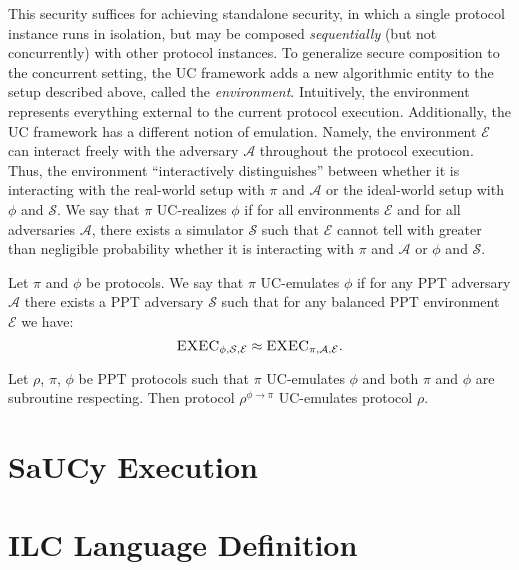 \documentclass{llncs}
\newcommand{\mc}[1]{\mathcal{{#1}}}
\begin{document}
This security suffices for achieving standalone security, in
which a single protocol instance runs in isolation, but may be
composed \emph{sequentially} (but not concurrently) with other protocol
instances. To generalize secure composition to the concurrent setting, the UC
framework adds a new algorithmic entity to the setup described above, called
the \emph{environment}. Intuitively, the environment represents everything
external to the current protocol execution. Additionally, the UC framework has a
different notion of emulation. Namely, the environment $\mc{E}$ can interact
freely with the adversary $\mc{A}$ throughout the protocol execution. Thus, the
environment ``interactively distinguishes'' between whether it is interacting
with the real-world setup with $\pi$ and $\mc{A}$ or the ideal-world setup with
$\phi$ and $\mc{S}$. We say that $\pi$ UC-realizes $\phi$ if for all
environments $\mc{E}$ and for all adversaries $\mc{A}$, there exists a simulator
$\mc{S}$ such that $\mc{E}$ cannot tell with greater than negligible probability
whether it is interacting with $\pi$ and $\mc{A}$ or $\phi$ and $\mc{S}$.

\begin{definition}
Let $\pi$ and $\phi$ be protocols. We say that $\pi$ UC-emulates $\phi$ if for
any PPT adversary $\mc{A}$ there exists a PPT adversary $\mc{S}$ such that for
any balanced PPT environment $\mc{E}$ we have:
\begin{equation*}
\textsc{EXEC}_{\phi, \mc{S}, \mc{E}} \approx \textsc{EXEC}_{\pi, \mc{A}, \mc{E}}.
\end{equation*}
\end{definition}

\begin{theorem}
Let $\rho$, $\pi$, $\phi$ be PPT protocols such that $\pi$ UC-emulates $\phi$
and both $\pi$ and $\phi$ are subroutine respecting. Then protocol
$\rho^{\phi \rightarrow \pi}$ UC-emulates protocol $\rho$.
\end{theorem}

\section{SaUCy Execution}



\section{ILC Language Definition}
\end{document}
